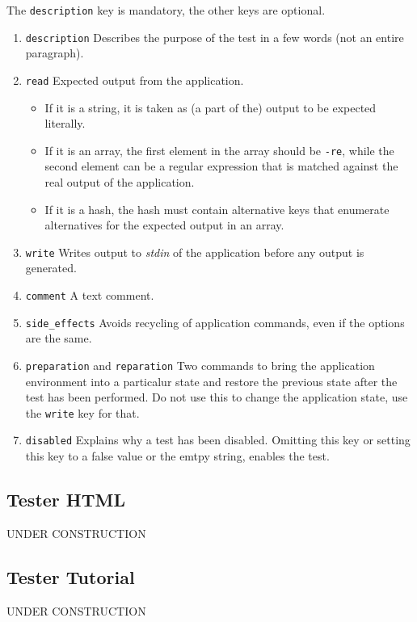 \documentclass[12pt]{article}
\begin{document}
The {\tt description} key is mandatory, the other keys are optional.

\begin{enumerate}
\item {\tt description} Describes the purpose of the test in a few words (not an entire paragraph).
\item {\tt read} Expected output from the application.
\begin{itemize}
\item If it is a string, it is taken as (a part of the) output to be expected literally.
\item If it is an array, the first element in the array should be {\tt -re}, while the second element can be a regular expression that is matched against the real output of the application.
\item If it is a hash, the hash must contain alternative keys that enumerate alternatives for the expected output in an array.
\end{itemize}
\item {\tt write} Writes output to {\it stdin} of the application before any output is generated.
\item {\tt comment} A text comment.
\item {\tt side\_effects} Avoids recycling of application commands, even if the options are the same.
\item {\tt preparation} and {\tt reparation} Two commands to bring the application environment into a particalur state and restore the previous state after the test has been performed. Do not use this to change the application state, use the {\tt write} key for that.
\item {\tt disabled} Explains why a test has been disabled. Omitting this key or setting this key to a false value or the emtpy string, enables the test.
\end{enumerate}
   
\subsection*{Tester HTML}

UNDER CONSTRUCTION 

\subsection*{Tester Tutorial}

UNDER CONSTRUCTION 
\end{document}
